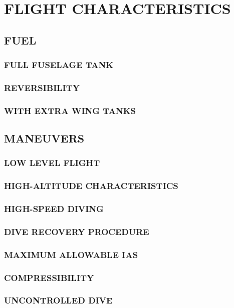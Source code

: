 \chapter{FLIGHT CHARACTERISTICS}
\minitoc{}
\cleardoublepage{}


\section{FUEL}
\subsection{FULL FUSELAGE TANK}
\subsection{REVERSIBILITY}
\subsection{WITH EXTRA WING TANKS}


\section{MANEUVERS}
\subsection{LOW LEVEL FLIGHT}
\subsection{HIGH-ALTITUDE CHARACTERISTICS}
\subsection{HIGH-SPEED DIVING}
\subsection{DIVE RECOVERY PROCEDURE}
\subsection{MAXIMUM ALLOWABLE IAS}
\subsection{COMPRESSIBILITY}
\subsection{UNCONTROLLED DIVE}
